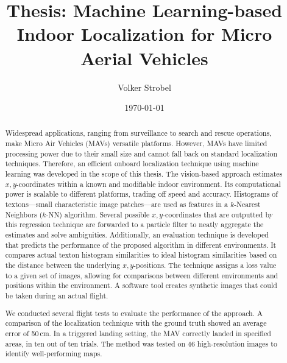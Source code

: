 \documentclass{report}
\title{Thesis: Machine Learning-based Indoor Localization for Micro
  Aerial Vehicles}
\author{Volker Strobel}
\date{\today}
\begin{document}
\maketitle
\begin{abstract}
  Widespread applications, ranging from surveillance to search and
  rescue operations, make Micro Air Vehicles (MAVs) versatile
  platforms.  However, MAVs have limited processing power due to their
  small size and cannot fall back on standard localization
  techniques. %
  Therefore, an efficient onboard localization technique using machine
  learning was developed in the scope of this thesis.
  The vision-based approach estimates $x,y$-coordinates within a known
  and modifiable indoor environment. Its computational power is
  scalable to different platforms, trading off speed and
  accuracy. Histograms of textons---small characteristic image
  patches---are used as features in a $k$-Nearest Neighbors ($k$-NN)
  algorithm. Several possible $x,y$-coordinates that are outputted by
  this regression technique are forwarded to a particle filter to
  neatly aggregate the estimates and solve ambiguities.
  Additionally, an evaluation technique is developed that predicts the
  performance of the proposed algorithm in different environments. It
  compares actual texton histogram similarities to ideal histogram
  similarities based on the distance between the underlying
  $x,y$-positions. The technique assigns a loss value to a given set
  of images, allowing for comparisons between different environments
  and positions within the environment. A software tool creates
  synthetic images that could be taken during an actual flight.


  We conducted several flight tests to evaluate the performance of the
  approach. A comparison of the localization technique with the ground
  truth showed an average error of 50\,cm. In a triggered landing
  setting, the MAV correctly landed in specified areas, in ten out of
  ten trials. The method was tested on 46 high-resolution images to
  identify well-performing maps.


\end{abstract}
\end{document}
